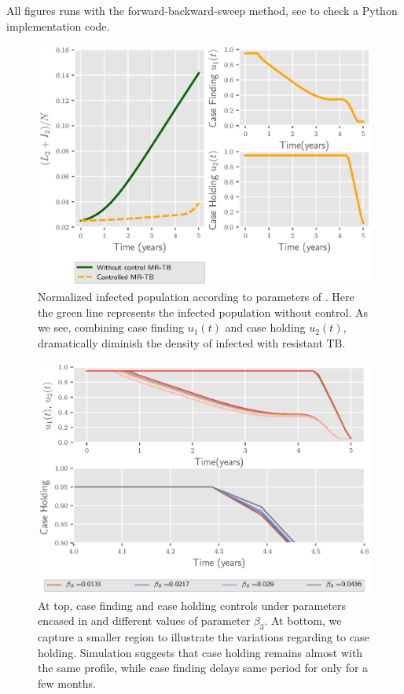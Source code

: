 All figures runs with the forward-backward-sweep method, see \cite{python_repo}
to check a Python implementation code.
%
\begin{figure}[H]
  \centering
  \includegraphics{Figures/figure_1_two_strain_tbm}
  \caption{Normalized infected population according to parameters of 
  . Here the green line represents the 
  infected population without control. As we see, combining case finding 
  $u_1(t)$ and  case holding $u_2(t)$, dramatically diminish the density of 
  infected with resistant TB.}
  \label{fig:figure1twostraintbm}
\end{figure}
%
\begin{figure}[H]
  \centering
  \includegraphics{Figures/figure_2_two_strain_tbm}
  \caption{
    At top, case finding and case holding controls 
    under parameters encased in  and
    different values of parameter $\beta_3$. At bottom, we capture a smaller
    region to illustrate the variations regarding to case holding. Simulation 
    suggests 
    that case holding remains almost with the same profile, while case finding 
    delays same period for only for a few months.
  }\label{fig:figure2twostraintbm}
\end{figure}
